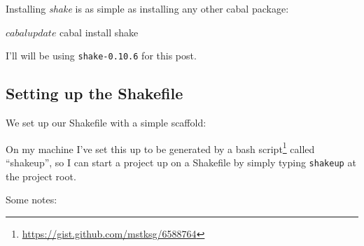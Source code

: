 \documentclass[]{article}
\newenvironment{Shaded}{}{}
\newcommand{\CommentTok}[1]{\textcolor[rgb]{0.38,0.63,0.69}{\textit{#1}}}
\newcommand{\DataTypeTok}[1]{\textcolor[rgb]{0.56,0.13,0.00}{#1}}
\newcommand{\ExtensionTok}[1]{#1}
\newcommand{\KeywordTok}[1]{\textcolor[rgb]{0.00,0.44,0.13}{\textbf{#1}}}
\newcommand{\NormalTok}[1]{#1}
\newcommand{\OperatorTok}[1]{\textcolor[rgb]{0.40,0.40,0.40}{#1}}
\newcommand{\OtherTok}[1]{\textcolor[rgb]{0.00,0.44,0.13}{#1}}
\newcommand{\StringTok}[1]{\textcolor[rgb]{0.25,0.44,0.63}{#1}}
\renewcommand{\href}[2]{#2\footnote{\url{#1}}}
\begin{document}
Installing \emph{shake} is as simple as installing any other cabal package:

\begin{Shaded}
\begin{Highlighting}[]
\ExtensionTok{$}\NormalTok{ cabal update}
\ExtensionTok{$}\NormalTok{ cabal install shake}
\end{Highlighting}
\end{Shaded}

I'll will be using \texttt{shake-0.10.6} for this post.

\subsection{Setting up the Shakefile}\label{setting-up-the-shakefile}

We set up our Shakefile with a simple scaffold:

\begin{Shaded}
\end{Shaded}

On my machine I've set this up to be generated by a
\href{https://gist.github.com/mstksg/6588764}{bash script} called ``shakeup'',
so I can start a project up on a Shakefile by simply typing \texttt{shakeup} at
the project root.

Some notes:
\end{document}
